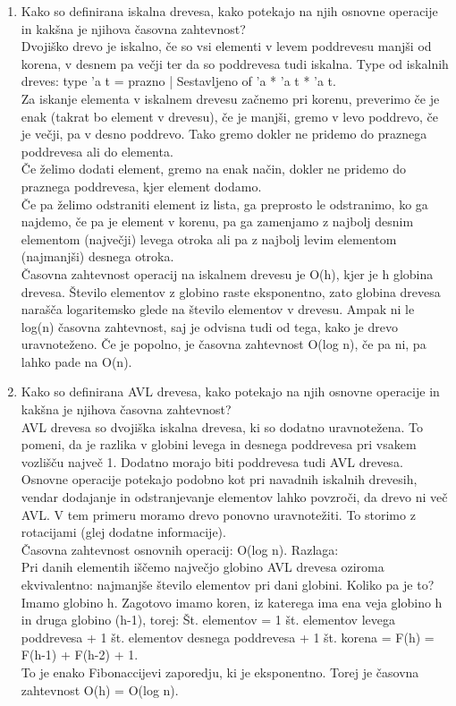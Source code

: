 \documentclass[a4paper]{article}
\begin{document}
\begin{enumerate}
        \item Kako so definirana iskalna drevesa, kako potekajo na njih osnovne operacije in kakšna je njihova časovna zahtevnost?\\
        Dvojiško drevo je iskalno, če so vsi elementi v levem poddrevesu manjši od korena, v desnem pa večji ter da so poddrevesa tudi iskalna. Type od iskalnih dreves: type 'a t = prazno | Sestavljeno of 'a * 'a t * 'a t.\\
        Za iskanje elementa v iskalnem drevesu začnemo pri korenu, preverimo če je enak (takrat bo element v drevesu), če je manjši, gremo v levo poddrevo, če je večji, pa v desno poddrevo. Tako gremo dokler ne pridemo do praznega poddrevesa ali do elementa.\\ 
        Če želimo dodati element, gremo na enak način, dokler ne pridemo do praznega poddrevesa, kjer element dodamo.\\
        Če pa želimo odstraniti element iz lista, ga preprosto le odstranimo, ko ga najdemo, če pa je element v korenu, pa ga zamenjamo z najbolj desnim elementom (največji) levega otroka ali pa z najbolj levim elementom (najmanjši) desnega otroka.\\ 
        Časovna zahtevnost operacij na iskalnem drevesu je O(h), kjer je h globina drevesa. Število elementov z globino raste eksponentno, zato globina drevesa narašča logaritemsko glede na število elementov v drevesu. Ampak ni le log(n) časovna zahtevnost, saj je odvisna tudi od tega, kako je drevo uravnoteženo. Če je popolno, je časovna zahtevnost O(log n), če pa ni, pa lahko pade na O(n).

        \item Kako so definirana AVL drevesa, kako potekajo na njih osnovne operacije in kakšna je njihova časovna zahtevnost?\\
        AVL drevesa so dvojiška iskalna drevesa, ki so dodatno uravnotežena. To pomeni, da je razlika v globini levega in desnega poddrevesa pri vsakem vozlišču največ 1. Dodatno morajo biti poddrevesa tudi AVL drevesa.\\
        Osnovne operacije potekajo podobno kot pri navadnih iskalnih drevesih, vendar dodajanje in odstranjevanje elementov lahko povzroči, da drevo ni več AVL. V tem primeru moramo drevo ponovno uravnotežiti. To storimo z rotacijami (glej dodatne informacije).\\
        Časovna zahtevnost osnovnih operacij: O(log n). Razlaga:\\
        Pri danih elementih iščemo največjo globino AVL drevesa oziroma ekvivalentno: najmanjše število elementov pri dani globini. Koliko pa je to? Imamo globino h. Zagotovo imamo koren, iz katerega ima ena veja globino h in druga globino (h-1), torej: Št. elementov = 1 št. elementov levega poddrevesa + 1 št. elementov desnega poddrevesa + 1 št. korena = F(h) = F(h-1) + F(h-2) + 1.\\
        To je enako Fibonaccijevi zaporedju, ki je eksponentno. Torej je časovna zahtevnost O(h) = O(log n).


\end{enumerate}
\end{document}
